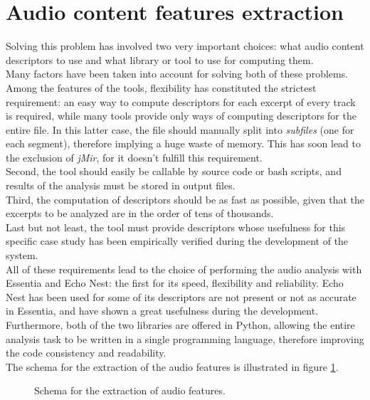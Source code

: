 \section{Audio content features extraction}
Solving this problem has involved two very important choices: what audio content descriptors to use and what library or tool to use for computing them. \\Many factors have been taken into account for solving both of these problems.\\ Among the features of the tools, flexibility has constituted the strictest requirement: an easy way to compute descriptors for each excerpt of every track is required, while many tools provide only ways of computing descriptors for the entire file. In this latter case, the file should manually split into \textit{subfiles} (one for each segment), therefore implying a huge waste of memory. This has soon lead to the exclusion of \textit{jMir}, for it doesn't fulfill this requirement. \\ 
Second, the tool should easily be callable by source code or bash scripts, and results of the analysis must be stored in output files. \\
Third, the computation of descriptors should be as fast as possible, given that the excerpts to be analyzed are in the order of tens of thousands. \\
Last but not least, the tool must provide descriptors whose usefulness for this specific case study has been empirically verified during the development of the system.\\
All of these requirements lead to the choice of performing the audio analysis with Essentia and Echo Nest: the first for its speed, flexibility and reliability. Echo Nest has been used for some of its descriptors are not present or not as accurate in Essentia, and have shown a great usefulness during the development. \\ Furthermore, both of the two libraries are offered in Python, allowing the entire analysis task to be written in a single programming language, therefore improving the code consistency and readability. \\
The schema for the extraction of the audio features is illustrated in figure \ref{fig:extraction}. \\ 
\begin{figure}[h]
\caption{Schema for the extraction of audio features.}
\label{fig:extraction}
\end{figure}

